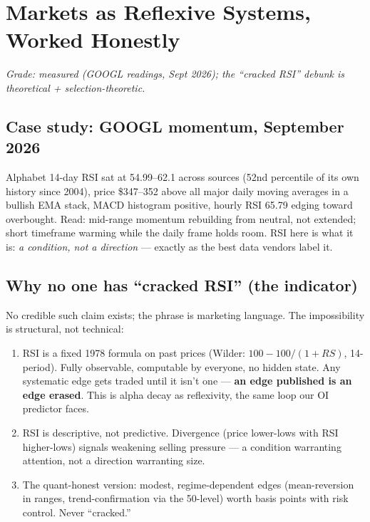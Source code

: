 \documentclass[11pt]{article}
\begin{document}
\section{Markets as Reflexive Systems, Worked Honestly}
\label{sec:markets}

\textit{Grade: measured (GOOGL readings, Sept 2026); the ``cracked RSI'' debunk is theoretical + selection-theoretic.}

\subsection{Case study: GOOGL momentum, September 2026}

Alphabet 14-day RSI sat at 54.99--62.1 across sources (52nd percentile of its own history since 2004), price \$347--352 above all major daily moving averages in a bullish EMA stack, MACD histogram positive, hourly RSI 65.79 edging toward overbought. Read: mid-range momentum rebuilding from neutral, not extended; short timeframe warming while the daily frame holds room. RSI here is what it is: \emph{a condition, not a direction} --- exactly as the best data vendors label it.

\subsection{Why no one has ``cracked RSI'' (the indicator)}

No credible such claim exists; the phrase is marketing language. The impossibility is structural, not technical:

\begin{enumerate}
\item RSI is a fixed 1978 formula on past prices (Wilder: $100 - 100/(1+RS)$, 14-period). Fully observable, computable by everyone, no hidden state. Any systematic edge gets traded until it isn't one --- \textbf{an edge published is an edge erased}. This is alpha decay as reflexivity, the same loop our OI predictor faces.
\item RSI is descriptive, not predictive. Divergence (price lower-lows with RSI higher-lows) signals weakening selling pressure --- a condition warranting attention, not a direction warranting size.
\item The quant-honest version: modest, regime-dependent edges (mean-reversion in ranges, trend-confirmation via the 50-level) worth basis points with risk control. Never ``cracked.''
\end{enumerate}
\end{document}
